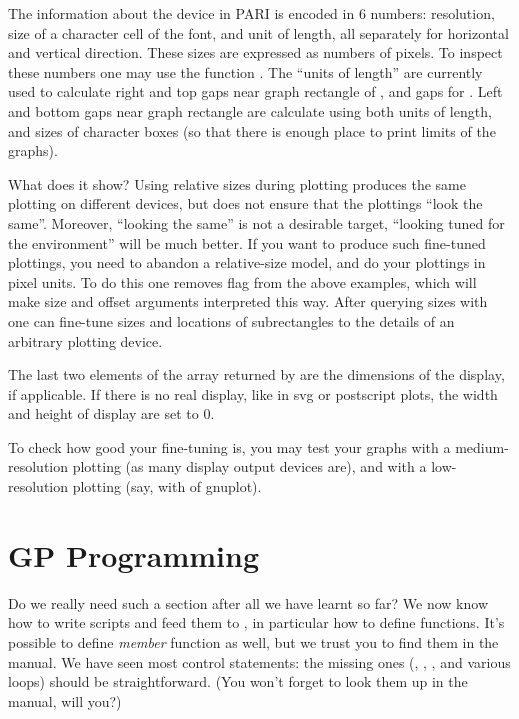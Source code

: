 The information about the device in PARI is encoded in 6 numbers: resolution,
size of a character cell of the font, and unit of length, all separately
for horizontal and vertical direction.  These sizes are expressed as
numbers of pixels.  To inspect these numbers one may use the function
.  The ``units of length'' are currently used to calculate
right and top gaps near graph rectangle of , and gaps for
.  Left and bottom gaps near graph rectangle are calculate
using both units of length, and sizes of character boxes (so that there
is enough place to print limits of the graphs).

What does it show?  Using relative sizes during plotting produces
 the same plotting on different devices, but does not
ensure that the plottings ``look the same''.  Moreover, ``looking the
same'' is not a desirable target, ``looking tuned for the environment''
will be much better.  If you want to produce such fine-tuned plottings,
you need to abandon a relative-size model, and do your plottings in
pixel units.  To do this one removes flag  from the above
examples, which will make size and offset arguments interpreted this way.
After querying sizes with  one can fine-tune sizes and
locations of subrectangles to the details of an arbitrary plotting
device.

The last two elements of the array returned by  are the
dimensions of the display, if applicable. If there is no real display, like
in svg or postscript plots, the width and height of display are set to $0$.

To check how good your fine-tuning is, you may test your graphs with a
medium-resolution plotting (as many display output devices are), and
with a low-resolution plotting (say, with  of gnuplot).

\section{GP Programming}

Do we really need such a section after all we have learnt so far? We now
know how to write scripts and feed them to , in particular how to
define functions. It's possible to define \emph{member} function as well, but
we trust you to find them in the manual. We have seen most control
statements: the missing ones (, , ,
 and various  loops) should be straightforward. (You
won't forget to look them up in the manual, will you?)

